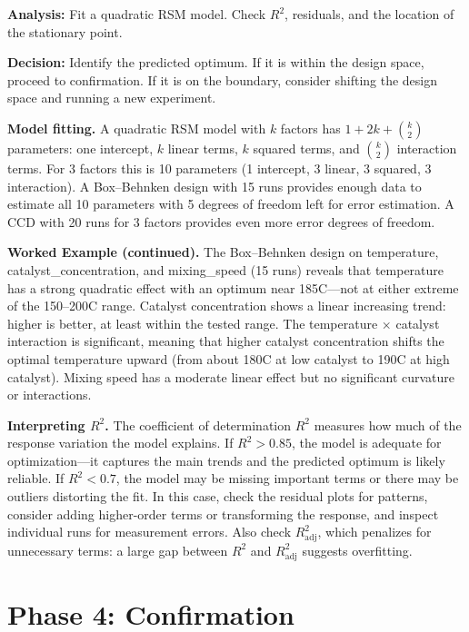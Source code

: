 \documentclass[11pt]{book}
\begin{document}
\textbf{Analysis:} Fit a quadratic RSM model. Check $R^2$, residuals, and the
location of the stationary point.

\textbf{Decision:} Identify the predicted optimum. If it is within the design
space, proceed to confirmation. If it is on the boundary, consider shifting the
design space and running a new experiment.

\medskip
\noindent\textbf{Model fitting.}
A quadratic RSM model with $k$ factors has $1 + 2k + \binom{k}{2}$ parameters:
one intercept, $k$ linear terms, $k$ squared terms, and $\binom{k}{2}$
interaction terms. For 3 factors this is 10 parameters (1 intercept, 3 linear,
3 squared, 3 interaction). A Box--Behnken design with 15 runs provides enough
data to estimate all 10 parameters with 5 degrees of freedom left for error
estimation. A CCD with 20 runs for 3 factors provides even more error degrees
of freedom.

\medskip
\noindent\textbf{Worked Example (continued).}
The Box--Behnken design on temperature, catalyst\_concentration, and
mixing\_speed (15 runs) reveals that temperature has a strong quadratic effect
with an optimum near 185\textdegree C---not at either extreme of the
150--200\textdegree C range. Catalyst concentration shows a linear increasing
trend: higher is better, at least within the tested range. The temperature
$\times$ catalyst interaction is significant, meaning that higher catalyst
concentration shifts the optimal temperature upward (from about 180\textdegree C
at low catalyst to 190\textdegree C at high catalyst). Mixing speed has a
moderate linear effect but no significant curvature or interactions.

\medskip
\noindent\textbf{Interpreting $R^2$.}
The coefficient of determination $R^2$ measures how much of the response
variation the model explains. If $R^2 > 0.85$, the model is adequate for
optimization---it captures the main trends and the predicted optimum is
likely reliable. If $R^2 < 0.7$, the model may be missing important terms or
there may be outliers distorting the fit. In this case, check the residual
plots for patterns, consider adding higher-order terms or transforming the
response, and inspect individual runs for measurement errors. Also check
$R^2_{\text{adj}}$, which penalizes for unnecessary terms: a large gap between
$R^2$ and $R^2_{\text{adj}}$ suggests overfitting.

\section{Phase 4: Confirmation}
\end{document}
